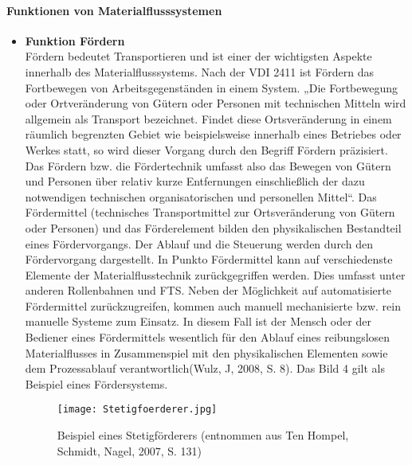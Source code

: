 \paragraph{Funktionen von Materialflusssystemen}
\begin{itemize}
	\item \textbf{Funktion F\"ordern} \\
F\"ordern bedeutet Transportieren und ist einer der wichtigsten Aspekte innerhalb des Materialflusssystems.
Nach der VDI 2411 ist F\"ordern das Fortbewegen von Arbeitsgegenst\"anden in einem System.
„Die Fortbewegung oder Ortver\"anderung von G\"utern oder Personen mit technischen Mitteln wird allgemein als Transport bezeichnet.
Findet diese Ortsver\"anderung in einem r\"aumlich begrenzten Gebiet wie beispielsweise innerhalb eines Betriebes 
oder Werkes statt, so wird dieser Vorgang durch den Begriff F\"ordern pr\"azisiert.
Das F\"ordern bzw. die F\"ordertechnik umfasst also das Bewegen von G\"utern und Personen \"uber relativ kurze Entfernungen 
einschlie\ss lich der dazu notwendigen technischen organisatorischen und personellen Mittel“\cite[S. 119]{Ten:2008}. 
Das F\"ordermittel (technisches Transportmittel zur Ortsver\"anderung von G\"utern oder Personen) und das F\"orderelement bilden 
den physikalischen Bestandteil eines F\"ordervorgangs.
Der Ablauf und die Steuerung werden durch den F\"ordervorgang dargestellt.
In Punkto F\"ordermittel kann auf verschiedenste Elemente der Materialflusstechnik zur\"uckgegriffen werden.
Dies umfasst unter anderen Rollenbahnen und FTS.
Neben der M\"oglichkeit auf automatisierte F\"ordermittel zur\"uckzugreifen, kommen auch manuell mechanisierte bzw. rein manuelle Systeme zum Einsatz.
In diesem Fall ist der Mensch oder der Bediener eines F\"ordermittels wesentlich f\"ur den Ablauf eines reibungslosen 
Materialflusses in Zusammenspiel mit den physikalischen Elementen sowie dem Prozessablauf verantwortlich\cite[S. 8]{Wulz:Johannes:2008}(Wulz, J, 2008, S. 8).
Das Bild 4 gilt als Beispiel eines F\"ordersystems. 
	\begin{figure}[h!]
	\centering
  \texttt{[image: Stetigfoerderer.jpg]}
	\caption{Beispiel eines Stetigf\"orderers (entnommen aus Ten Hompel, Schmidt, Nagel, 2007, S. 131)}
	\label{Stetigfoerderer}
\end{figure}


\end{itemize}
